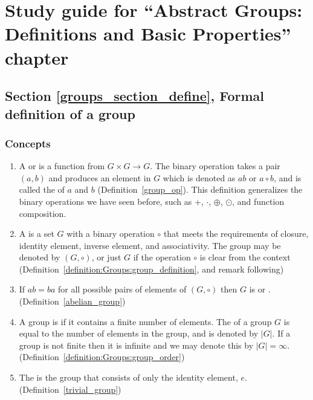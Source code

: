 \section{Study guide  for ``Abstract Groups: Definitions and Basic Properties''  chapter}\label{sec:Groups:study} 


\subsection*{Section \ref{groups_section_define}, Formal definition of a group}
\subsubsection*{Concepts}
\begin{enumerate}
\item %
A  or  is a function from $G \times G \rightarrow G$. The binary operation takes a pair $(a,b)$ and produces an element in $G$ which is denoted as $ab$ or $a \circ b$, and is  called the  of $a$ and $b$ (Definition~\ref{group_op}). This definition generalizes the binary operations we have seen before, such as +, $\cdot$, $\oplus$, $\odot$, and function composition.
\item
A  is a set $G$ with a binary operation $\circ$ that meets the requirements of closure, identity element, inverse element, and associativity. The group may be denoted by $(G,\circ)$, or just $G$ if the operation $\circ$ is clear from the context  (Definition~\ref{definition:Groups:group_definition}, and remark following)
\item
If $ab=ba$ for all possible pairs of elements of $(G, \circ)$ then $G$ is  or . (Definition~\ref{abelian_group})
\item
 A group is   if it contains a finite number of elements.  The  of a group $G$ is equal to the number of elements in the group, and is denoted by $|G|$. If a group is not finite then it is infinite and we may denote this by $|G| = \infty$. (Definition~\ref{definition:Groups:group_order})
\item
The  is the group that consists of only the identity element, $e$. (Definition~\ref{trivial_group})
\end{enumerate}

